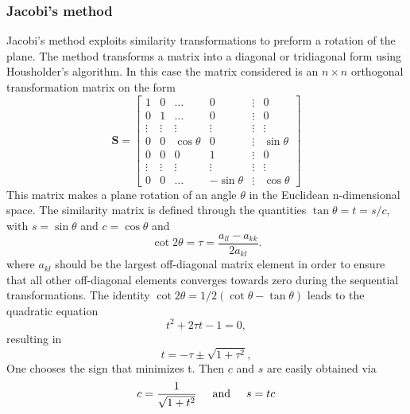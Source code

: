 \documentclass[%
reprint,
amsmath, 
amssymb, 
aps,]{revtex4-1}
\begin{document}
		\subsubsection*{Jacobi's method}  \noindent 
Jacobi's method exploits similarity transformations to preform a rotation of the plane. The method transforms a matrix into a diagonal or tridiagonal form using Housholder's algorithm. In this case the matrix considered is an $n\times n$ orthogonal transformation matrix on the form \vspace{1mm}
			\begin{equation*}
\mathbf{S} = \begin{bmatrix}
1 & 0  & \dots & 0 &\vdots &0 \\
0 & 1  & \dots & 0 & \vdots & 0 \\
\vdots & \vdots &\vdots&\vdots&\vdots&\vdots\\
0 & 0 & \cos{\theta} & 0 &\vdots & \sin{\theta} \\
0  & 0 & 0 & 1 &\vdots & 0 \\
 \vdots & \vdots &\vdots&\vdots&\vdots&\vdots\\
 0 & 0 &\dots & -\sin{\theta} & \vdots & \cos{\theta}
\end{bmatrix}
			\end{equation*}\vspace{1mm}
\noindent 
This matrix makes a plane rotation of an angle $\theta$ in the Euclidean n-dimensional space. The similarity matrix is defined through the quantities $\tan\theta = t= s/c$, with $s=\sin\theta$ and $c=\cos\theta$ and
			\begin{equation*}
\cot 2\theta=\tau = \frac{a_{ll}-a_{kk}}{2a_{kl}}.
			\end{equation*}
where $a_{kl}$ should be the largest off-diagonal matrix element in order to ensure that all other off-diagonal elements converges towards zero during the sequential transformations. The identity $\cot 2\theta=1/2(\cot \theta-\tan\theta)$ leads to the quadratic equation
			\begin{equation*}
t^2+2\tau t-1= 0,
			\end{equation*}
resulting in
			\begin{equation*}
t = -\tau \pm \sqrt{1+\tau^2},
			\end{equation*}
One chooses the sign that minimizes t. Then $c$ and $s$ are easily obtained via
			\begin{equation}\label{sc}
c = \frac{1}{\sqrt{1+t^2}} \hspace{5mm}  \textnormal{and} \hspace{5mm} s=tc
			\end{equation}
\end{document}
